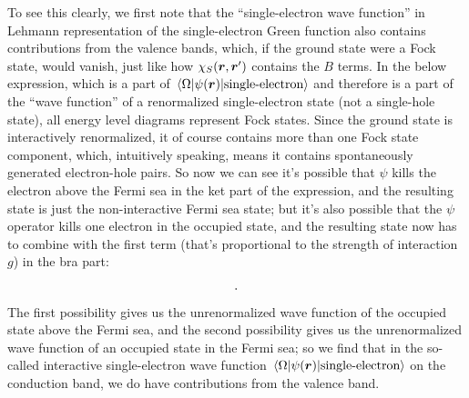 \documentclass[hyperref, a4paper, 12pt]{report}
\begin{document}
To see this clearly,
we first note that the ``single-electron wave function'' 
in Lehmann representation of the single-electron Green function 
also contains contributions from the valence bands,  
which, if the ground state were a Fock state, 
would vanish, just like how $\chi_{S}(\vb*{r}, \vb*{r}')$ 
contains the $B$ terms.
In the below expression, 
which is a part of $\mel{\Omega}{\psi(\vb*{r})}{\text{single-electron}}$
and therefore is a part of 
the ``wave function'' of a renormalized single-electron state 
(not a single-hole state), 
all energy level diagrams represent Fock states.
Since the ground state is interactively renormalized, 
it of course contains more than one Fock state component, 
which, intuitively speaking, 
means it contains spontaneously generated electron-hole pairs.
So now we can see it's possible that $\psi$ kills 
the electron above the Fermi sea in the ket part of the expression, 
and the resulting state is just the 
non-interactive Fermi sea state; 
but it's also possible that the $\psi$ operator kills one electron 
in the occupied state, 
and the resulting state now has to combine with the 
first term (that's proportional to the strength of interaction $g$) 
in the bra part:
\begin{equation}
    \protect.
    \label{eq:electron-hole-remixing-1}
\end{equation}
The first possibility gives us the unrenormalized wave function 
of the occupied state above the Fermi sea, 
and the second possibility gives us the unrenormalized wave function 
of an occupied state in the Fermi sea; 
so we find that in the so-called interactive single-electron wave function 
$\mel{\Omega}{\psi(\vb*{r})}{\text{single-electron}}$ on the conduction band,
we do have contributions from the valence band. 
\end{document}
